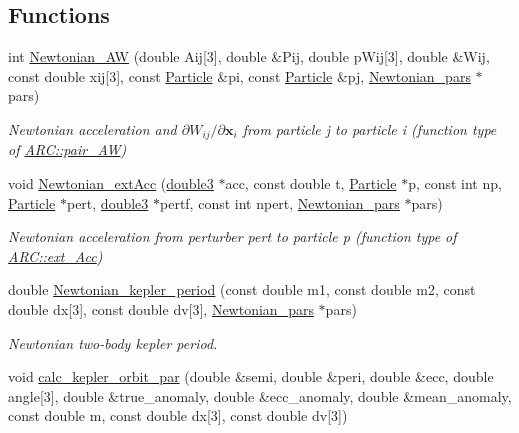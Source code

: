 \subsection*{Functions}
\begin{DoxyCompactItemize}
\item 
int \hyperlink{namespaceNTA_aad37ae368f0a920088e180a73187685a}{Newtonian\+\_\+\+AW} (double Aij\mbox{[}3\mbox{]}, double \&Pij, double p\+Wij\mbox{[}3\mbox{]}, double \&Wij, const double xij\mbox{[}3\mbox{]}, const \hyperlink{classParticle}{Particle} \&pi, const \hyperlink{classParticle}{Particle} \&pj, \hyperlink{classNTA_1_1Newtonian__pars}{Newtonian\+\_\+pars} $\ast$pars)
\begin{DoxyCompactList}\small\item\em Newtonian acceleration and $\partial W_{ij}/\partial \mathbf{x}_i$ from particle j to particle i (function type of \hyperlink{namespaceARC_afc1f57a75859038cbd2492366fd1849c}{A\+R\+C\+::pair\+\_\+\+AW}) \end{DoxyCompactList}\item 
void \hyperlink{namespaceNTA_a5b1a4fcaa09041cdf89a6b3122815c56}{Newtonian\+\_\+ext\+Acc} (\hyperlink{namespaceNTA_a19ccaac066849b26305dbbbee129fa0e}{double3} $\ast$acc, const double t, \hyperlink{classParticle}{Particle} $\ast$p, const int np, \hyperlink{classParticle}{Particle} $\ast$pert, \hyperlink{namespaceNTA_a19ccaac066849b26305dbbbee129fa0e}{double3} $\ast$pertf, const int npert, \hyperlink{classNTA_1_1Newtonian__pars}{Newtonian\+\_\+pars} $\ast$pars)
\begin{DoxyCompactList}\small\item\em Newtonian acceleration from perturber pert to particle p (function type of \hyperlink{namespaceARC_aa423c7d6aff9481c040a20b3c5c6ff4e}{A\+R\+C\+::ext\+\_\+\+Acc}) \end{DoxyCompactList}\item 
double \hyperlink{namespaceNTA_a5125fd91a773d67901c4e0f8896e3dca}{Newtonian\+\_\+kepler\+\_\+period} (const double m1, const double m2, const double dx\mbox{[}3\mbox{]}, const double dv\mbox{[}3\mbox{]}, \hyperlink{classNTA_1_1Newtonian__pars}{Newtonian\+\_\+pars} $\ast$pars)
\begin{DoxyCompactList}\small\item\em Newtonian two-\/body kepler period. \end{DoxyCompactList}\item 
void \hyperlink{namespaceNTA_a02d22f02e21004b264c8257a5ffbb600}{calc\+\_\+kepler\+\_\+orbit\+\_\+par} (double \&semi, double \&peri, double \&ecc, double angle\mbox{[}3\mbox{]}, double \&true\+\_\+anomaly, double \&ecc\+\_\+anomaly, double \&mean\+\_\+anomaly, const double m, const double dx\mbox{[}3\mbox{]}, const double dv\mbox{[}3\mbox{]})

\end{DoxyCompactItemize}
